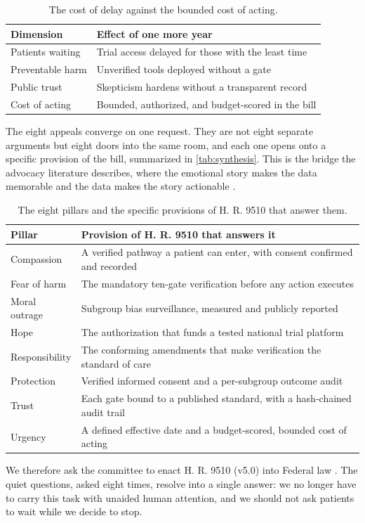 \begin{table}[H]
\footnotesize
\begin{tabularx}{\textwidth}{@{}L{4.4cm} Y@{}}
\toprule
\textbf{Dimension} & \textbf{Effect of one more year}\\
\midrule
Patients waiting & Trial access delayed for those with the least time\\
Preventable harm & Unverified tools deployed without a gate\\
Public trust & Skepticism hardens without a transparent record\\
Cost of acting & Bounded, authorized, and budget-scored in the bill\\
\bottomrule
\end{tabularx}
\caption{The cost of delay against the bounded cost of acting.}
\label{tab:urgency}
\end{table}

The eight appeals converge on one request. They are not eight separate arguments
but eight doors into the same room, and each one opens onto a specific provision
of the bill, summarized in \autoref{tab:synthesis}. This is the bridge the
advocacy literature describes, where the emotional story makes the data memorable
and the data makes the story actionable \cite{moreland2015hearing, kok2013finding}.

\begin{table}[H]
\footnotesize
\begin{tabularx}{\textwidth}{@{}L{3.0cm} Y@{}}
\toprule
\textbf{Pillar} & \textbf{Provision of H. R. 9510 that answers it}\\
\midrule
Compassion & A verified pathway a patient can enter, with consent confirmed and recorded\\
Fear of harm & The mandatory ten-gate verification before any action executes\\
Moral outrage & Subgroup bias surveillance, measured and publicly reported\\
Hope & The authorization that funds a tested national trial platform\\
Responsibility & The conforming amendments that make verification the standard of care\\
Protection & Verified informed consent and a per-subgroup outcome audit\\
Trust & Each gate bound to a published standard, with a hash-chained audit trail\\
Urgency & A defined effective date and a budget-scored, bounded cost of acting\\
\bottomrule
\end{tabularx}
\caption{The eight pillars and the specific provisions of H. R. 9510 that answer them.}
\label{tab:synthesis}
\end{table}

We therefore ask the committee to enact H. R. 9510 (v5.0) into Federal law
\cite{Kawchak2026HR9510Bill}. The quiet questions, asked eight times, resolve into
a single answer: we no longer have to carry this task with unaided human attention,
and we should not ask patients to wait while we decide to stop.
